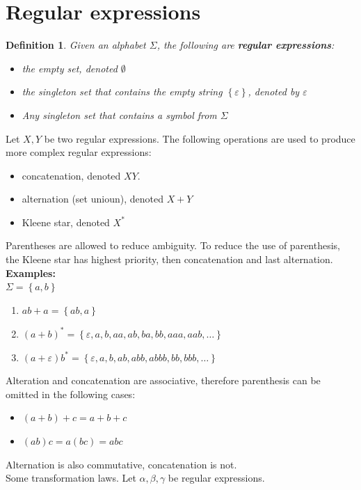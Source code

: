 \documentclass[a4paper]{article}
\newtheorem{definition}{Definition}
\begin{document}
\section{Regular expressions}
\begin{definition}
    Given an alphabet $\Sigma$, the following are \textbf{regular expressions}:
    \begin{itemize}
        \item the empty set, denoted $\emptyset$
        \item the singleton set that contains the empty string 
            $\left\{ \varepsilon \right\}$, denoted by $\varepsilon$
        \item Any singleton set that contains a symbol from $\Sigma$
    \end{itemize}
\end{definition}
Let $X,Y$ be two regular expressions. The following operations are used to
produce more complex regular expressions:
\begin{itemize}
    \item concatenation, denoted $XY$.
    \item alternation (set unioun), denoted $X+Y$
    \item Kleene star, denoted $X^*$
\end{itemize}
Parentheses are allowed to reduce ambiguity. To reduce the use of parenthesis,
the Kleene star has highest priority, then concatenation and last alternation.
\textbf{Examples:}\\
$\Sigma = \left\{ a,b \right\}$
\begin{enumerate}
    \item $ab+a=\left\{ ab,a \right\}$
    \item $\left( a+b \right)^*=\left\{ \varepsilon,a,b,aa,ab,ba,bb,aaa,aab,\ldots \right\}$
    \item $\left(a+\varepsilon\right)b^*=\left\{ \varepsilon,a,b,ab,abb,abbb,bb,bbb,\ldots \right\}$
\end{enumerate}
Alteration and concatenation are associative, therefore parenthesis can be
omitted in the following cases:
\begin{itemize}
    \item $(a+b)+c=a+b+c$
    \item $(ab)c=a(bc)=abc$
\end{itemize}
Alternation is also commutative, concatenation is not.\\
Some transformation laws. Let $\alpha,\beta,\gamma$ be regular expressions.
\end{document}

